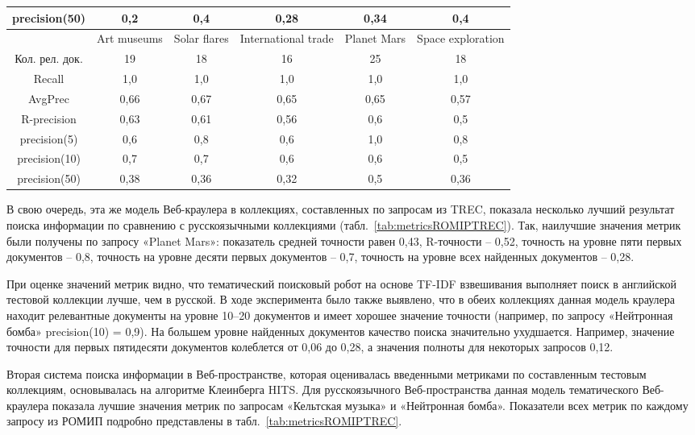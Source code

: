 \begin{table}[ht]
\begin{adjustbox}{width=0.9\textwidth}
\begin{tabular}{| c | c | c | c | c | c |}
		precision(50) & 0,2 & 0,4 & 0,28 & 0,34 & 0,4  \\
		\hline
		& Art museums & Solar flares & International trade &  Planet Mars &  Space exploration \\
		\hline
		Кол. рел. док. & 19 & 18 & 16 & 25 & 18  \\
		\hline
		Recall & 1,0 & 1,0 & 1,0 & 1,0 & 1,0 \\
		\hline
		AvgPrec & 0,66 & 0,67 & 0,65 & 0,65 & 0,57  \\
		\hline
		R-precision & 0,63 & 0,61 & 0,56 & 0,6 & 0,5  \\
		\hline
		precision(5) & 0,6 & 0,8 & 0,6 & 1,0 & 0,8  \\
		\hline
		precision(10) & 0,7 & 0,7 & 0,6 & 0,6 & 0,5  \\
		\hline
		precision(50) & 0,38 & 0,36 & 0,32 & 0,5 & 0,36  \\
		\hline
	\end{tabular}%
\end{adjustbox}
\end{table}

В свою очередь, эта же модель Веб-краулера в коллекциях, составленных по запросам из TREC, показала несколько лучший результат поиска информации по сравнению с русскоязычными коллекциями (табл.~\cref{tab:metricsROMIPTREC}). Так, наилучшие значения метрик были получены по запросу «Planet Mars»: показатель средней точности равен 0,43, R-точности -- 0,52, точность на уровне пяти первых документов -- 0,8, точность на уровне десяти первых документов -- 0,7, точность на уровне всех найденных документов -- 0,28.

При оценке значений метрик видно, что тематический поисковый робот на основе TF-IDF взвешивания выполняет поиск в английской тестовой коллекции лучше, чем в русской. В ходе эксперимента было также выявлено, что в обеих коллекциях данная модель краулера находит релевантные документы на уровне 10–20 документов и имеет хорошее значение точности (например, по запросу «Нейтронная бомба» precision(10) = 0,9). На большем уровне найденных документов качество поиска значительно ухудшается. Например, значение точности для первых пятидесяти документов колеблется от 0,06 до 0,28, а значения полноты для некоторых запросов 0,12.

Вторая система поиска информации в Веб-пространстве, которая оценивалась введенными метриками по составленным тестовым коллекциям, основывалась на алгоритме Клеинберга HITS. Для русскоязычного Веб-пространства данная модель тематического Веб-краулера показала лучшие значения метрик по запросам «Кельтская музыка» и «Нейтронная бомба». Показатели всех метрик по каждому запросу из РОМИП подробно представлены в табл.~\cref{tab:metricsROMIPTREC}.


